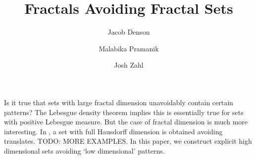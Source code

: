 \documentclass{article}
\title{Fractals Avoiding Fractal Sets}
\author{Jacob Denson\\ \and Malabika Pramanik\\ \and Josh Zahl}
\theoremstyle{plain}
\theoremstyle{plain}
\begin{document}
\maketitle


\begin{abstract}
	\blindtext[1]
\end{abstract}


Is it true that sets with large fractal dimension unavoidably contain certain patterns? The Lebesgue density theorem implies this is essentially true for sets with positive Lebesgue measure. But the case of fractal dimension is much more interesting. In \cite{KeletiDimOneSet}, a set with full Hausdorff dimension is obtained avoiding translates. TODO: MORE EXAMPLES. In this paper, we construct explicit high dimensional sets avoiding `low dimensional' patterns.


%
%


\end{document}
